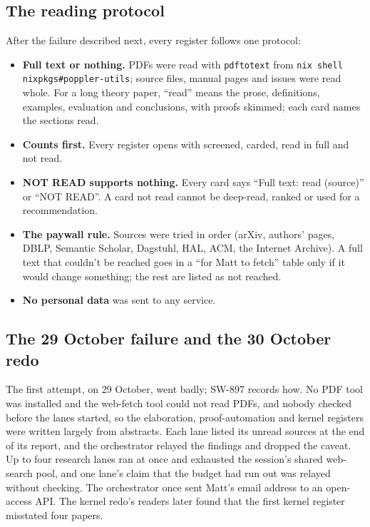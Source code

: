 \documentclass[11pt,a4paper]{article}
\newcommand{\code}[1]{\texttt{#1}}
\begin{document}
\subsection{The reading protocol}

After the failure described next, every register follows one protocol:
\begin{itemize}
  \item \textbf{Full text or nothing.} PDFs were read with \code{pdftotext} from
        \code{nix shell nixpkgs\#poppler-utils}; source files, manual pages and issues were read
        whole. For a long theory paper, ``read'' means the prose, definitions, examples,
        evaluation and conclusions, with proofs skimmed; each card names the sections read.
  \item \textbf{Counts first.} Every register opens with screened, carded, read in full and not
        read.
  \item \textbf{NOT READ supports nothing.} Every card says ``Full text: read (source)'' or
        ``NOT READ''. A card not read cannot be deep-read, ranked or used for a recommendation.
  \item \textbf{The paywall rule.} Sources were tried in order (arXiv, authors' pages, DBLP,
        Semantic Scholar, Dagstuhl, HAL, ACM, the Internet Archive). A full text that couldn't be
        reached goes in a ``for Matt to fetch'' table only if it would change something; the
        rest are listed as not reached.
  \item \textbf{No personal data} was sent to any service.
\end{itemize}

\subsection{The 29 October failure and the 30 October redo}

The first attempt, on 29 October, went badly; SW-897 records how. No PDF tool was installed and
the web-fetch tool could not read PDFs, and nobody checked before the lanes started, so the
elaboration, proof-automation and kernel registers were written largely from abstracts. Each
lane listed its unread sources at the end of its report, and the orchestrator relayed the
findings and dropped the caveat. Up to four research lanes ran at once and exhausted the
session's shared web-search pool, and one lane's claim that the budget had run out was relayed
without checking. The orchestrator once sent Matt's email address to an open-access API. The
kernel redo's readers later found that the first kernel register misstated four papers.
\end{document}
